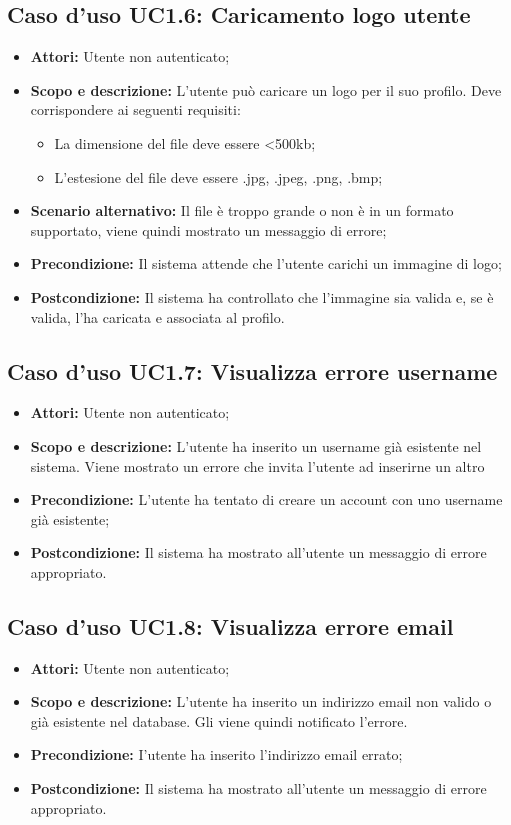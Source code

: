 \documentclass[12pt,a4paper,titlepage]{article}
\begin{document}
	\subsection{Caso d'uso UC1.6: Caricamento logo utente}
	\label{UC1.6}
	\begin{itemize}
		\item \textbf{Attori: }Utente non autenticato;
		\item \textbf{Scopo e descrizione: }L'utente può caricare un logo per il suo profilo. Deve corrispondere ai seguenti requisiti:
		\begin{itemize}
			\item La dimensione del file deve essere <500kb;
			\item L'estesione del file deve essere .jpg, .jpeg, .png, .bmp;
		\end{itemize}
		\item \textbf{Scenario alternativo: }Il file è troppo grande o non è in un formato supportato, viene quindi mostrato un messaggio di errore;
		\item \textbf{Precondizione: }Il sistema attende che l'utente carichi un immagine di logo;
		\item \textbf{Postcondizione: }Il sistema ha controllato che l'immagine sia valida e, se è valida, l'ha caricata e associata al profilo.
	\end{itemize}
	\subsection{Caso d'uso UC1.7: Visualizza errore username}
	\label{UC1.7}
	\begin{itemize}
		\item \textbf{Attori: }Utente non autenticato;
		\item \textbf{Scopo e descrizione: }L'utente ha inserito un username già esistente nel sistema. Viene mostrato un errore che invita l'utente ad inserirne un altro
		\item \textbf{Precondizione: }L'utente ha tentato di creare un account con uno username già esistente;
		\item \textbf{Postcondizione: }Il sistema ha mostrato all'utente un messaggio di errore appropriato.
	\end{itemize}
	\subsection{Caso d'uso UC1.8: Visualizza errore email}
	\label{UC1.8}
	\begin{itemize}
		\item \textbf{Attori: }Utente non autenticato;
		\item \textbf{Scopo e descrizione: }L'utente ha inserito un indirizzo email non valido o già esistente nel database. Gli viene quindi notificato l'errore.
		\item \textbf{Precondizione: }I'utente ha inserito l'indirizzo email errato;
		\item \textbf{Postcondizione: }Il sistema ha mostrato all'utente un messaggio di errore appropriato.
	\end{itemize}
\end{document}
